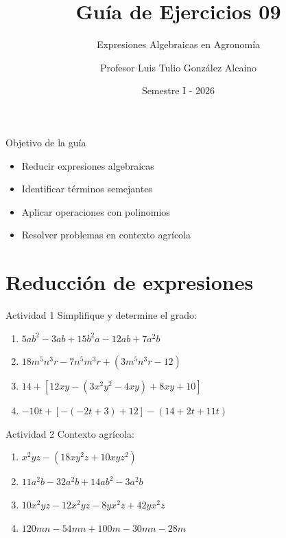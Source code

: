 \documentclass[handout,aspectratio=169,11pt]{beamer}
\title{Guía de Ejercicios 09}
\subtitle{Expresiones Algebraicas en Agronomía}
\author{Profesor Luis Tulio González Alcaino}
\institute{Universidad Santo Tomás \\ Departamento de Ciencias Básicas}
\date{Semestre I - 2026}
\begin{document}
	
	\begin{frame}
		\titlepage
	\end{frame}
	
	\begin{frame}{Objetivo de la guía}
		\begin{itemize}
			\item Reducir expresiones algebraicas
			\item Identificar términos semejantes
			\item Aplicar operaciones con polinomios
			\item Resolver problemas en contexto agrícola
		\end{itemize}
	\end{frame}
	
	\section{Reducción de expresiones}
	
	\begin{frame}{Actividad 1}
		\small
		Simplifique y determine el grado:
		
		\begin{enumerate}
			\item $5ab^2 - 3ab + 15b^2a - 12ab + 7a^2b$
			\item $18m^5n^3r - 7n^5m^3r + (3m^5n^3r - 12)$
			\item $14 + [12xy - (3x^2y^2 - 4xy) + 8xy + 10]$
			\item $-10t + [-( -2t + 3) + 12] - (14 + 2t + 11t)$
		\end{enumerate}
	\end{frame}
	
	\begin{frame}{Actividad 2}
		\small
		Contexto agrícola:
		
		\begin{enumerate}
			\item $x^2yz - (18xy^2z + 10xyz^2)$
			\item $11a^2b - 32a^2b + 14ab^2 - 3a^2b$
			\item $10x^2yz - 12x^2yz - 8yx^2z + 42yx^2z$
			\item $120mn - 54mn + 100m - 30mn - 28m$
		\end{enumerate}
	\end{frame}
	
\end{document}
